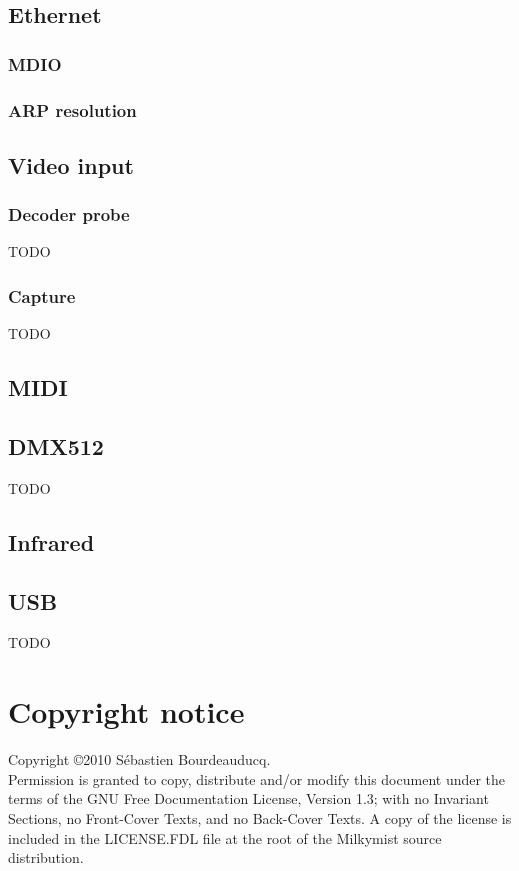 \documentclass[a4paper,11pt]{article}
\begin{document}
\subsection{Ethernet}
\subsubsection{MDIO}
\subsubsection{ARP resolution}
\subsection{Video input}
\subsubsection{Decoder probe}
TODO
\subsubsection{Capture}
TODO
\subsection{MIDI}
\subsection{DMX512}
TODO
\subsection{Infrared}
\subsection{USB}
TODO

\section*{Copyright notice}
Copyright \copyright 2010 S\'ebastien Bourdeauducq. \\
Permission is granted to copy, distribute and/or modify this document under the terms of the GNU Free Documentation License, Version 1.3; with no Invariant Sections, no Front-Cover Texts, and no Back-Cover Texts. A copy of the license is included in the LICENSE.FDL file at the root of the Milkymist source distribution.
\end{document}
